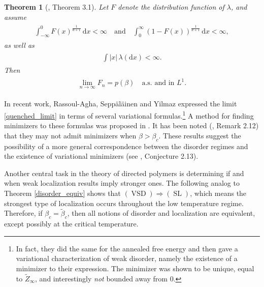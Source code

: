 \documentclass[11pt,reqno]{amsart}
\numberwithin{equation}{section}
\newtheorem{thm}{Theorem}[section]
\theoremstyle{definition}
\begin{document}
\begin{thm}[\cite{vargas07}, Theorem 3.1]  \label{Fn_converges}
Let $F$ denote the distribution function of $\lambda$, and assume
{\begin{align} \begin{split} {
\int_{-\infty}^0 F(x)^{\frac{1}{d+1}}\, {\mathrm{d}} x < \infty \quad \text{and} \quad
\int_0^\infty (1 - F(x))^{\frac{1}{d+1}}\, {\mathrm{d}} x < \infty, \label{finiteness_assumption1}
} \end{split} \end{align}}
as well as
{\begin{align} \begin{split} {
\int |x|\, \lambda({\mathrm{d}} x) < \infty \label{finiteness_assumption2}.
} \end{split} \end{align}}
Then
{\begin{align} \begin{split} {
\lim_{n \to \infty} F_n = p(\beta) \quad \mathrm{a.s.}\text{~and in $L^1$.} \label{quenched_limit}
} \end{split} \end{align}}
\end{thm}

In recent work, Rassoul-Agha, Sepp\"al\"ainen and Yilmaz \cite{rassoul-seppalainen-yilmaz13,rassoul-seppalainen-yilmaz15} 
expressed the limit \eqref{quenched_limit} in terms of several variational formulas.\footnote{In fact, they did the same for the annealed free energy and then gave a variational characterization of weak disorder, namely the existence of a minimizer to their expression.
The minimizer was shown to be unique, equal to ${\widetilde{{Z}}}_\infty$, and interestingly \textit{not} bounded away from 0.}
A method for finding minimizers to these formulas was proposed in \cite{georgiou-rassoul-seppalainen16}.
It has been noted (\cite{rassoul-seppalainen-yilmaz15}, Remark 2.12) that they may not admit minimizers when $\beta > \beta_c$.
These results suggest the possibility of a more general correspondence between the disorder regimes and the existence of variational minimizers (see \cite{rassoul-seppalainen-yilmaz15}, Conjecture 2.13).

Another central task in the theory of directed polymers is determining if and when weak localization results imply stronger ones.
The following analog to Theorem \ref{disorder_equiv} shows that $(\operatorname{VSD}) \Rightarrow (\operatorname{SL})$, which means the strongest type of localization occurs throughout the low temperature regime.
Therefore, if $\beta_c = {\widetilde{{\beta}}}_c$, then all notions of disorder and localization are equivalent, except possibly at the critical temperature.
\end{document}
